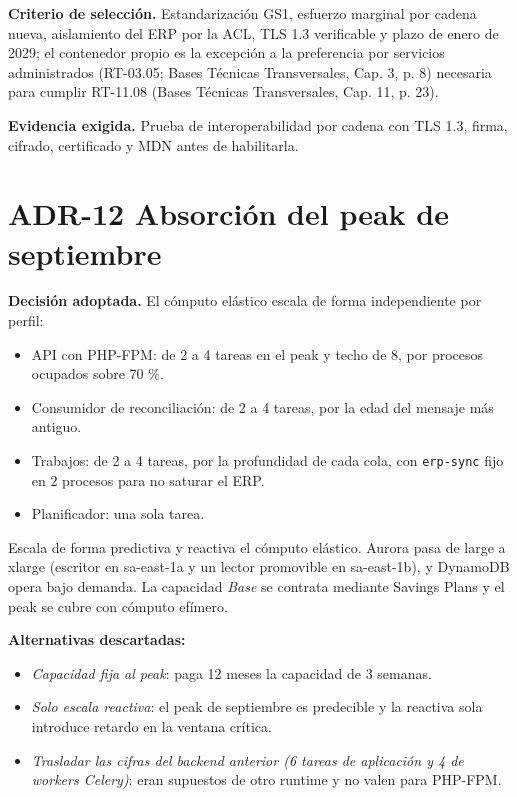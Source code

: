 \textbf{Criterio de selección.} Estandarización GS1, esfuerzo marginal por cadena nueva, aislamiento del ERP por la ACL, TLS 1.3 verificable y plazo de enero de 2029; el contenedor propio es la excepción a la preferencia por servicios administrados (RT-03.05; Bases Técnicas Transversales, Cap. 3, p. 8) necesaria para cumplir RT-11.08 (Bases Técnicas Transversales, Cap. 11, p. 23).

\textbf{Evidencia exigida.} Prueba de interoperabilidad por cadena con TLS 1.3, firma, cifrado, certificado y MDN antes de habilitarla.

\section{ADR-12 \textperiodcentered{} Absorción del peak de septiembre}
\label{sub:adr-12}

\textbf{Decisión adoptada.} El cómputo elástico escala de forma independiente por perfil:

\begin{itemize}
  \item API con PHP-FPM: de 2 a 4 tareas en el peak y techo de 8, por procesos ocupados sobre 70 \%.
  \item Consumidor de reconciliación: de 2 a 4 tareas, por la edad del mensaje más antiguo.
  \item Trabajos: de 2 a 4 tareas, por la profundidad de cada cola, con \texttt{erp-sync} fijo en 2 procesos para no saturar el ERP.
  \item Planificador: una sola tarea.
\end{itemize}

Escala de forma predictiva y reactiva el cómputo elástico. Aurora pasa de large a xlarge (escritor en sa-east-1a y un lector promovible en sa-east-1b), y DynamoDB opera bajo demanda. La capacidad \emph{Base} se contrata mediante Savings Plans y el peak se cubre con cómputo efímero.

\textbf{Alternativas descartadas:}

\begin{itemize}
  \item \emph{Capacidad fija al peak}: paga 12 meses la capacidad de 3 semanas.
  \item \emph{Solo escala reactiva}: el peak de septiembre es predecible y la reactiva sola introduce retardo en la ventana crítica.
  \item \emph{Trasladar las cifras del backend anterior (6 tareas de aplicación y 4 de workers Celery)}: eran supuestos de otro runtime y no valen para PHP-FPM.
\end{itemize}

